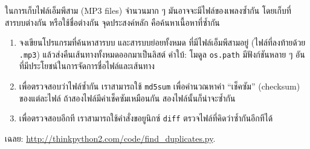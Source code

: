 \begin{exercise}
\label{checksum}


ในการเก็บไฟล์เอ็มพีสาม (MP3 files) จำนวนมาก ๆ
มันอาจจะมีไฟล์ของเพลงซ้ำกัน โดยเก็บที่สารบบต่างกัน หรือใช้ชื่อต่างกัน
จุดประสงค์หลัก คือค้นหาเนื้อหาที่ซ้ำกัน

\begin{enumerate}


\item จงเขียนโปรแกรมที่ค้นหาสารบบ และสารบบย่อยทั้งหมด
ที่มีไฟล์เอ็มพีสามอยู่ 
(ไฟล์ที่ลงท้ายด้วย \texttt{.mp3})
แล้วส่งคืนเส้นทางทั้งหมดออกมาเป็นลิสต์
คำใบ้: โมดูล \texttt{os.path} มีฟังก์ชันหลาย ๆ อัน 
ที่มีประโยชน์ในการจัดการชื่อไฟล์และเส้นทาง



\item เพื่อตรวจสอบว่าไฟล์ซ้ำกัน
เราสามารถใช้ \texttt{md5sum} เพื่อคำนวณหาค่า ``เช็คซัม'' (checksum) ของแต่ละไฟล์ 
ถ้าสองไฟล์มีค่าเช็คซัมเหมือนกัน สองไฟล์นั้นก็น่าจะซ้ำกัน



\item เพื่อตรวจสอบอีกที เราสามารถใช้คำสั่งขอยูนิกซ์ \texttt{diff} ตรวจไฟล์ที่คิดว่าซ้ำกันอีกทีได้

\end{enumerate}


เฉลย: \url{http://thinkpython2.com/code/find_duplicates.py}.


\end{exercise}
\vspace{0.5cm}

